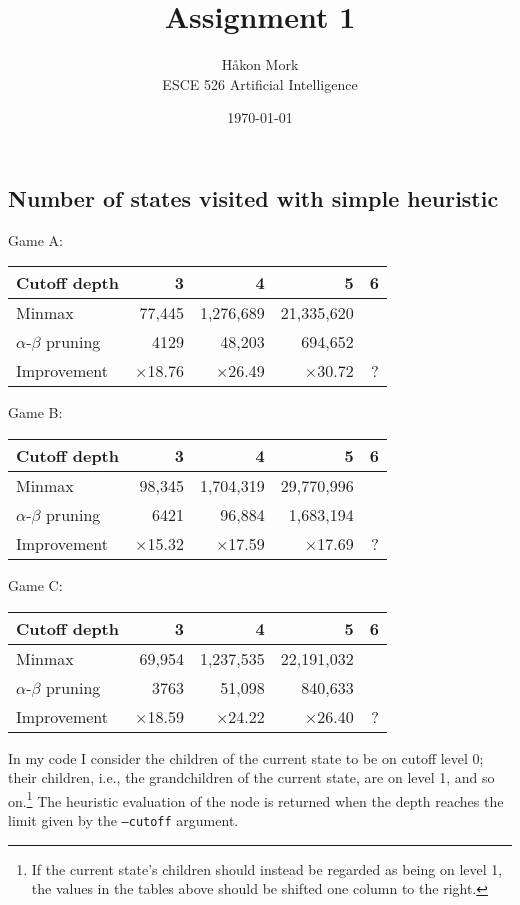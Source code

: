 \documentclass[letterpaper, 12pt]{article}
\title{\textbf{Assignment 1}}
\author{Håkon Mork \\ ESCE 526 Artificial Intelligence}
\date{\today}
\numberwithin{theorem}{section}
\begin{document}
\maketitle
\noindent

\section{}
\subsection{Number of states visited with simple heuristic}
Game A:
\begin{table}[h]
	\centering
	\small
	\begin{tabular}{lrrrr}
		Cutoff depth & 3 & 4 & 5 & 6 \\
		\midrule
		Minmax & 77,445 & 1,276,689 & 21,335,620 &  \\
		$\alpha$-$\beta$ pruning & 4129 & 48,203 & 694,652 &  \\
		\midrule
		Improvement & $\times$18.76 & $\times$26.49 & $\times$30.72 & ?
	\end{tabular}
\end{table}

\noindent Game B:
\begin{table}[h]
	\centering
	\small
	\begin{tabular}{lrrrr}
		Cutoff depth & 3 & 4 & 5 & 6 \\
		\midrule
		Minmax & 98,345 & 1,704,319 & 29,770,996 & \\
		$\alpha$-$\beta$ pruning & 6421 & 96,884 & 1,683,194 &  \\
		\midrule
		Improvement & $\times$15.32 & $\times$17.59 & $\times$17.69 & ?
	\end{tabular}
\end{table}

\noindent Game C:
\begin{table}[h]
	\centering
	\small
	\begin{tabular}{lrrrr}
		Cutoff depth & 3 & 4 & 5 & 6 \\
		\midrule
		Minmax & 69,954 & 1,237,535 & 22,191,032 & \\
		$\alpha$-$\beta$ pruning & 3763 & 51,098 & 840,633 &  \\
		\midrule
		Improvement & $\times$18.59 & $\times$24.22 & $\times$26.40 & ?
	\end{tabular}
\end{table}

In my code I consider the children of the current state to be on cutoff level 0; their children, i.e., the grandchildren of the current state, are on level 1, and so on.\footnote{If the current state's children should instead be regarded as being on level 1, the values in the tables above should be shifted one column to the right.} The heuristic evaluation of the node is returned when the depth reaches the limit given by the \texttt{--cutoff} argument. 
\end{document}
